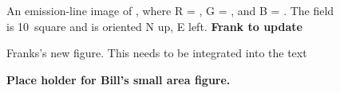


\pagebreak



\clearpage

\startlongtable



\pagebreak
%


\begin{figure}
\caption{An emission-line image of \gal, where R = \ha, G = \sii, and B = \oiii.  The field is 10\arcmin\ square and is oriented N up, E left.  {\bf Frank to update} }
\end{figure}

\begin{figure}
\caption{Franks's new figure. This needs to be integrated into the text \label{fig_overview}}
\end{figure}

\begin{figure}
\caption{\bf Place holder for Bill's small area figure. \label{fig_example_image}}
\end{figure}

